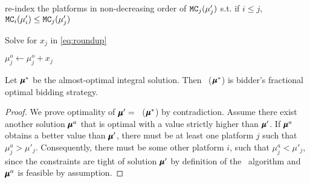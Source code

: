{%

\renewcommand*{\algorithmcfname}{SUBROUTINE}
\begin{algorithm}[ht]
\DontPrintSemicolon
\LinesNumbered
\SetNoFillComment
{}
re-index the platforms in non-decreasing order of $\texttt{MC}_j(\mu'_j)$ s.t. if $i \leq j$, $\texttt{MC}_i(\mu'_i) \leq \texttt{MC}_j(\mu'_j)$

Solve for $x_j$ in \eqref{eq:roundup}

$\mu_j^o \gets \mu_j^o + x_j$




\caption{\roundup}
\label{sub:roudup}
\end{algorithm}

\begin{lemma}\label{cor:opt} Let $\mathbf{\pmb{\mu}}^*$ be the almost-optimal integral solution. Then \roundup\ ($\mathbf{\pmb{\mu}}^*$) is bidder's fractional optimal bidding strategy.
\end{lemma}
\begin{proof}
We prove optimality of $\pmb{\mu}' = $ \roundup\ ($\mathbf{\pmb{\mu}}^*$) by contradiction. Assume there exist another solution $\pmb{\mu}^a$ that is optimal with a value strictly higher than $\pmb{\mu}'$. If $\pmb{\mu}^a$ obtains a better value than $\pmb{\mu}'$, there must be at least one platform $j$ such that $\mu^a_j > \mu'_j$. Consequently, there must be some other platform $i$, such that $\mu^a_j < \mu'_j$, since the constraints are tight of solution $\pmb{\mu}'$ by definition of the \roundup\ algorithm and $\pmb{\mu}^a$ is feasible by assumption.


\end{proof}}
